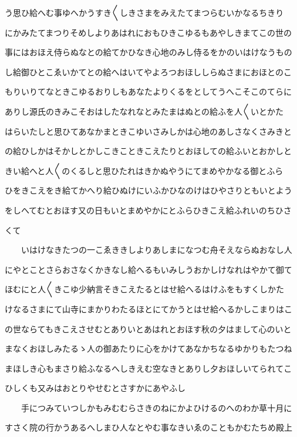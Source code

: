 \documentclass[a4paper,11pt,landscape]{ltjtarticle}
\begin{document}
う思ひ給へむ事ゆへかうすき〱しきさまをみえたてまつらむいかなるちきり
\par\medskip
にかみたてまつりそめしよりあはれにおもひきこゆるもあやしきまてこの世の
\par\medskip
事にはおほえ侍らぬなとの給てかひなき心地のみし侍るをかのいはけなうもの
\par\medskip
し給御ひとこゑいかてとの給へはいてやよろつおほししらぬさまにおほとのこ
\par\medskip
もりいりてなときこゆるおりしもあなたよりくるをとしてうへこそこのてらに
\par\medskip
ありし源氏のきみこそおはしたなれなとみたまはぬとの給ふを人〱いとかた
\par\medskip
はらいたしと思ひてあなかまときこゆいさみしかは心地のあしさなくさみきと
\par\medskip
の給ひしかはそかしとかしこきこときこえたりとおほしての給ふいとおかしと
\par\medskip
きい給へと人〱のくるしと思ひたれはきかぬやうにてまめやかなる御とふら
\par\medskip
ひをきこえをき給てかへり給ひぬけにいふかひなのけはひやさりともいとよう
\par\medskip
をしへてむとおほす又の日もいとまめやかにとふらひきこえ給ふれいのちひさ
\par\medskip
くて
\par\medskip
　　いはけなきたつの一こゑききしよりあしまになつむ舟そえならぬおなし人
\par\medskip
にやとことさらおさなくかきなし給へるもいみしうおかしけなれはやかて御て
\par\medskip
ほむにと人〱きこゆ少納言そきこえたるとはせ給へるはけふをもすくしかた
\par\medskip
けなるさまにて山寺にまかりわたるほとにてかうとはせ給へるかしこまりはこ
\par\medskip
の世ならてもきこえさせむとありいとあはれとおほす秋の夕はまして心のいと
\par\medskip
まなくおほしみたるゝ人の御あたりに心をかけてあなかちなるゆかりもたつね
\par\medskip
まほしき心もまさり給ふなるへしきえむ空なきとありし夕おほしいてられてこ
\par\medskip
ひしくも又みはおとりやせむとさすかにあやふし
\par\medskip
　　手につみていつしかもみむむらさきのねにかよひけるのへのわか草十月に
\par\medskip
すさく院の行かうあるへしまひ人なとやむ事なきいゑのこともかむたちめ殿上
\par\medskip
\end{document}
